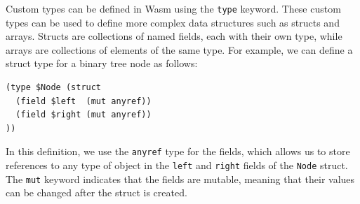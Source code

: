 Custom types can be defined in Wasm using the \texttt{type} keyword. These custom types can be used to define more complex data structures such as structs and arrays. Structs are collections of named fields, each with their own type, while arrays are collections of elements of the same type. For example, we can define a struct type for a binary tree node as follows:
\begin{verbatim}
(type $Node (struct
  (field $left  (mut anyref))
  (field $right (mut anyref))
))
\end{verbatim}
In this definition, we use the \texttt{anyref} type for the fields, which allows us to store references to any type of object in the \texttt{left} and \texttt{right} fields of the \texttt{Node} struct. The \texttt{mut} keyword indicates that the fields are mutable, meaning that their values can be changed after the struct is created.